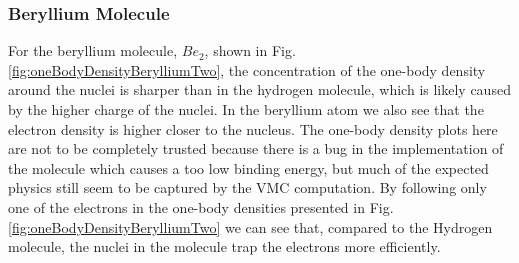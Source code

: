 		\subsubsection{Beryllium Molecule}

			For the beryllium molecule, $Be_{2}$, shown in
                        Fig. \ref{fig:oneBodyDensityBerylliumTwo}, the
                        concentration of the one-body density around
                        the nuclei is sharper than in the hydrogen
                        molecule, which is likely caused by the higher
                        charge of the nuclei. In the beryllium atom we
                        also see that the electron density is higher
                        closer to the nucleus. The one-body density
                        plots here are not to be completely trusted
                        because there is a bug in the implementation
                        of the molecule which causes a too low binding
                        energy, but much of the expected physics still
                        seem to be captured by the VMC computation. By
                        following only one of the electrons in the
                        one-body densities presented in
                        Fig. \ref{fig:oneBodyDensityBerylliumTwo} we
                        can see that, compared to the Hydrogen
                        molecule, the nuclei in the molecule trap
                        the  electrons more efficiently.
			

